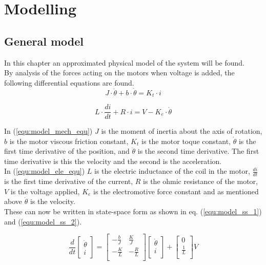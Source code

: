 \documentclass[../../main]{subfiles}
\begin{document}
\section{Modelling}

\subsection{General model}
\label{sec:General_model}

In this chapter an approximated physical model of the system will be found.\\

By analysis of the forces acting on the motors when voltage is added, the following differential equations are found.\\

\begin{equation}
  \label{equ:model_mech_equ}
  J\cdot \ddot \theta + b\cdot \dot \theta = K_t\cdot i
\end{equation}

\begin{equation}
  \label{equ:model_ele_equ}
  L\cdot \frac{di}{dt} + R\cdot i = V - K_e\cdot \dot \theta
\end{equation}

In (\ref{equ:model_mech_equ}) $J$ is the moment of inertia about the axis of rotation, $b$ is the motor viscous friction constant, $K_t$ is the motor toque constant, $\dot \theta$ is the first time derivative of the position, and $\ddot \theta$ is the second time derivative. The first time derivative is this the velocity and the second is the acceleration.\\
In (\ref{equ:model_ele_equ}) $L$ is the electric inductance of the coil in the motor, $\frac{di}{dt}$ is the first time derivative of the current, $R$ is the ohmic resistance of the motor, $V$ is the voltage applied, $K_e$ is the electromotive force constant and as mentioned above $\dot \theta$ is the velocity.\\
These can now be written in state-space form as shown in eq. (\ref{equ:model_ss_1}) and (\ref{equ:model_ss_2}).

\begin{equation}
      \label{equ:model_ss_1}
      \frac{d}{dt}
    \begin{bmatrix}
        \dot \theta \\
        i
    \end{bmatrix}
    =
    \begin{bmatrix}
        -\frac{b}{J} & \frac{K}{J}\\
        -\frac{K}{L} & -\frac{R}{L}\\
    \end{bmatrix}
    \begin{bmatrix}
        \dot \theta \\
        i \\
    \end{bmatrix}
    +
    \begin{bmatrix}
        0 \\
        \frac{1}{L} \\
    \end{bmatrix}
    V
\end{equation}
\end{document}
